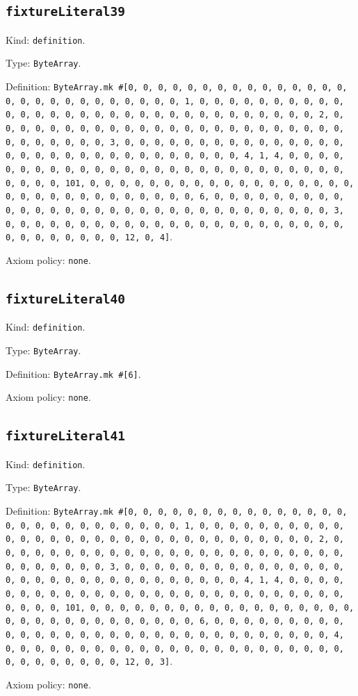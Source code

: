 \documentclass[11pt]{article}
\begin{document}
\subsection*{\texttt{fixtureLiteral39}}
\noindent Kind: \texttt{definition}.\par
\noindent Type: \texttt{ByteArray}.\par
\noindent Definition: \texttt{ByteArray.mk \#[0, 0, 0, 0, 0, 0, 0, 0, 0, 0, 0, 0, 0, 0, 0, 0, 0, 0, 0, 0, 0, 0, 0, 0, 0, 0, 0, 1, 0, 0, 0, 0, 0, 0, 0, 0, 0, 0, 0, 0, 0, 0, 0, 0, 0, 0, 0, 0, 0, 0, 0, 0, 0, 0, 0, 0, 0, 0, 0, 2, 0, 0, 0, 0, 0, 0, 0, 0, 0, 0, 0, 0, 0, 0, 0, 0, 0, 0, 0, 0, 0, 0, 0, 0, 0, 0, 0, 0, 0, 0, 0, 3, 0, 0, 0, 0, 0, 0, 0, 0, 0, 0, 0, 0, 0, 0, 0, 0, 0, 0, 0, 0, 0, 0, 0, 0, 0, 0, 0, 0, 0, 0, 0, 4, 1, 4, 0, 0, 0, 0, 0, 0, 0, 0, 0, 0, 0, 0, 0, 0, 0, 0, 0, 0, 0, 0, 0, 0, 0, 0, 0, 0, 0, 0, 0, 0, 0, 101, 0, 0, 0, 0, 0, 0, 0, 0, 0, 0, 0, 0, 0, 0, 0, 0, 0, 0, 0, 0, 0, 0, 0, 0, 0, 0, 0, 0, 0, 0, 0, 6, 0, 0, 0, 0, 0, 0, 0, 0, 0, 0, 0, 0, 0, 0, 0, 0, 0, 0, 0, 0, 0, 0, 0, 0, 0, 0, 0, 0, 0, 0, 0, 3, 0, 0, 0, 0, 0, 0, 0, 0, 0, 0, 0, 0, 0, 0, 0, 0, 0, 0, 0, 0, 0, 0, 0, 0, 0, 0, 0, 0, 0, 0, 0, 12, 0, 4]}.\par
\noindent Axiom policy: \texttt{none}.\par
\subsection*{\texttt{fixtureLiteral40}}
\noindent Kind: \texttt{definition}.\par
\noindent Type: \texttt{ByteArray}.\par
\noindent Definition: \texttt{ByteArray.mk \#[6]}.\par
\noindent Axiom policy: \texttt{none}.\par
\subsection*{\texttt{fixtureLiteral41}}
\noindent Kind: \texttt{definition}.\par
\noindent Type: \texttt{ByteArray}.\par
\noindent Definition: \texttt{ByteArray.mk \#[0, 0, 0, 0, 0, 0, 0, 0, 0, 0, 0, 0, 0, 0, 0, 0, 0, 0, 0, 0, 0, 0, 0, 0, 0, 0, 0, 1, 0, 0, 0, 0, 0, 0, 0, 0, 0, 0, 0, 0, 0, 0, 0, 0, 0, 0, 0, 0, 0, 0, 0, 0, 0, 0, 0, 0, 0, 0, 0, 2, 0, 0, 0, 0, 0, 0, 0, 0, 0, 0, 0, 0, 0, 0, 0, 0, 0, 0, 0, 0, 0, 0, 0, 0, 0, 0, 0, 0, 0, 0, 0, 3, 0, 0, 0, 0, 0, 0, 0, 0, 0, 0, 0, 0, 0, 0, 0, 0, 0, 0, 0, 0, 0, 0, 0, 0, 0, 0, 0, 0, 0, 0, 0, 4, 1, 4, 0, 0, 0, 0, 0, 0, 0, 0, 0, 0, 0, 0, 0, 0, 0, 0, 0, 0, 0, 0, 0, 0, 0, 0, 0, 0, 0, 0, 0, 0, 0, 101, 0, 0, 0, 0, 0, 0, 0, 0, 0, 0, 0, 0, 0, 0, 0, 0, 0, 0, 0, 0, 0, 0, 0, 0, 0, 0, 0, 0, 0, 0, 0, 6, 0, 0, 0, 0, 0, 0, 0, 0, 0, 0, 0, 0, 0, 0, 0, 0, 0, 0, 0, 0, 0, 0, 0, 0, 0, 0, 0, 0, 0, 0, 0, 4, 0, 0, 0, 0, 0, 0, 0, 0, 0, 0, 0, 0, 0, 0, 0, 0, 0, 0, 0, 0, 0, 0, 0, 0, 0, 0, 0, 0, 0, 0, 0, 12, 0, 3]}.\par
\noindent Axiom policy: \texttt{none}.\par
\end{document}
